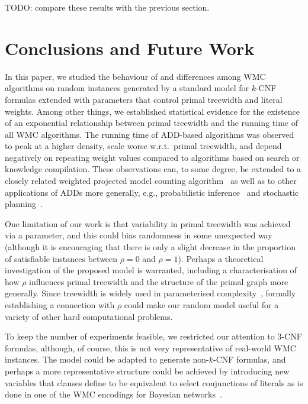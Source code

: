 \documentclass[runningheads]{llncs}
\begin{document}
TODO: compare these results with the previous section.

\section{Conclusions and Future Work}

In this paper, we studied the behaviour of and differences among \textsf{WMC}
algorithms on random instances generated by a standard model for $k$-CNF
formulas extended with parameters that control primal treewidth and literal
weights. Among other things, we established statistical evidence for the
existence of an exponential relationship between primal treewidth and the
running time of all \textsf{WMC} algorithms. The running time of ADD-based
algorithms was observed to peak at a higher density, scale worse w.r.t.\ primal
treewidth, and depend negatively on repeating weight values compared to
algorithms based on search or knowledge compilation. These observations can, to
some degree, be extended to a closely related weighted projected model counting
algorithm~\cite{DBLP:conf/sat/DudekPV21} as well as to other applications of
ADDs more generally, e.g., probabilistic
inference~\cite{DBLP:conf/ijcai/ChaviraD07,DBLP:conf/uai/GogateD11} and
stochastic planning~\cite{DBLP:conf/uai/HoeySHB99}.

One limitation of our work is that variability in primal treewidth was achieved
via a parameter, and this could bias randomness in some unexpected way (although
it is encouraging that there is only a slight decrease in the proportion of
satisfiable instances between $\rho=0$ and $\rho = 1$). Perhaps a theoretical
investigation of the proposed model is warranted, including a characterisation
of how $\rho$ influences primal treewidth and the structure of the primal graph
more generally. Since treewidth is widely used in parameterised
complexity~\cite{DBLP:series/txcs/DowneyF13}, formally establishing a connection
with $\rho$ could make our random model useful for a variety of other hard
computational problems.

To keep the number of experiments feasible, we restricted our attention to 3-CNF
formulas, although, of course, this is not very representative of real-world
\textsf{WMC} instances. The model could be adapted to generate non-$k$-CNF
formulas, and perhaps a more representative structure could be achieved by
introducing new variables that clauses define to be equivalent to select
conjunctions of literals as is done in one of the \textsf{WMC} encodings for
Bayesian networks~\cite{DBLP:conf/kr/Darwiche02}.
\end{document}
